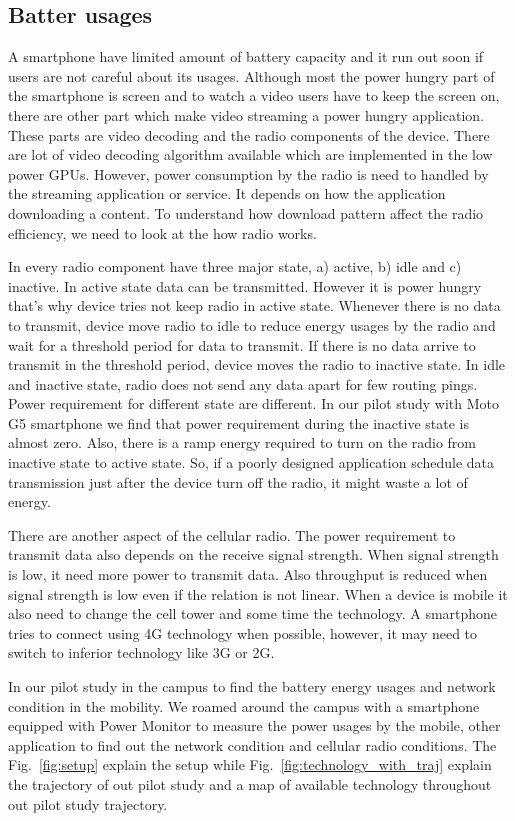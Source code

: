 \subsection{Batter usages}
A smartphone have limited amount of battery capacity and it run out soon if users are not careful about its usages. Although most the power hungry part of the smartphone is screen and to watch a video users have to keep the screen on, there are other part which make video streaming a power hungry application. These parts are video decoding and the radio components of the device. There are lot of video decoding algorithm available which are implemented in the low power GPUs. However, power consumption by the radio is need to handled by the streaming application or service. It depends on how the application downloading a content. To understand how download pattern affect the radio efficiency, we need to look at the how radio works. 

In every radio component have three major state, a) active, b) idle and c) inactive. In active state data can be transmitted. However it is power hungry that's why device tries not keep radio in active state. Whenever there is no data to transmit, device move radio to idle to reduce energy usages by the radio and wait for a threshold period for data to transmit. If there is no data arrive to transmit in the threshold period, device moves the radio to inactive state. In idle and inactive state, radio does not send any data apart for few routing pings. Power requirement for different state are different. In our pilot study with Moto G5 smartphone we find that power requirement during the inactive state is almost zero. Also, there is a ramp energy required to turn on the radio from inactive state to active state. So, if a poorly designed application schedule data transmission just after the device turn off the radio, it might waste a lot of energy.

There are another aspect of the cellular radio. The power requirement to transmit data also depends on the receive signal strength. When signal strength is low, it need more power to transmit data. Also throughput is reduced when signal strength is low even if the relation is not linear. When a device is mobile it also need to change the cell tower and some time the technology. A smartphone tries to connect using 4G technology when possible, however, it may need to switch to inferior technology like 3G or 2G.

In our pilot study in the campus to find the battery energy usages and network condition in the mobility. We roamed around the campus with a smartphone equipped with Power Monitor to measure the power usages by the mobile, other application to find out the network condition and cellular radio conditions. The Fig.~\ref{fig:setup} explain the setup while Fig.~\ref{fig:technology_with_traj} explain the trajectory of out pilot study and a map of available technology throughout out pilot study trajectory.

